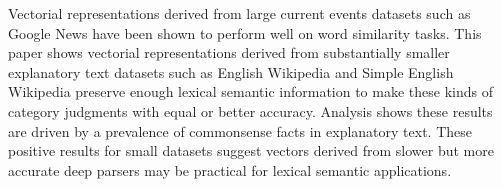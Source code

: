 Vectorial representations derived from large current events datasets such as Google News have been shown to perform well on word similarity tasks. This paper shows vectorial representations derived from substantially smaller explanatory text datasets such as English Wikipedia and Simple English Wikipedia preserve enough lexical semantic information to make these kinds of category judgments with equal or better accuracy. Analysis shows these results are driven by a prevalence of commonsense facts in explanatory text. These positive results for small datasets suggest vectors derived from slower but more accurate deep parsers may be practical for lexical semantic applications.
